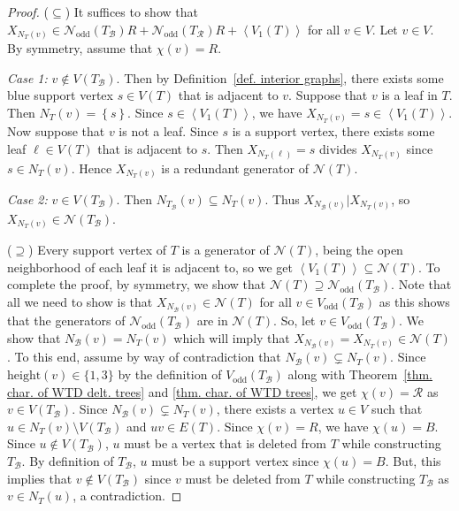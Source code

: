 \documentclass[12pt, reqno]{amsart}
\theoremstyle{definition}
\theoremstyle{plain}
\theoremstyle{definition}
\newcommand{\hh}{\mbox{height}}
\newcommand{\R}{\mathcal{R}}
\newcommand{\B}{\mathcal{B}}
\newcommand\gen[1]{\left\langle #1 \right\rangle}
\newcommand\set[1]{\left\lbrace #1 \right\rbrace}
\newcommand{\NN}{\mathcal{N}}
\begin{document}
\begin{proof}
($\subseteq$) It suffices to show that $X_{N_T(v)} \in \NN_{\text{odd}}(T_\B)R + \NN_{\text{odd}}(T_\R)R + \gen{V_1(T)}$ for all $v \in V$.
Let $v \in V$.
By symmetry, assume that $\chi(v) = R$.

\setlength{\leftskip}{5mm}

\noindent\emph{Case 1:} $v \not\in V(T_\B)$.  
Then by Definition~\ref{def. interior graphs}, there exists some blue support vertex $s \in V(T)$ that is adjacent to $v$.
Suppose that $v$ is a leaf in $T$. 
Then $N_T(v) = \set{s}$.
Since $s \in \gen{V_1(T)}$, we have $X_{N_T(v)} = s \in \gen{V_1(T)}$.
Now suppose that $v$ is not a leaf.
Since $s$ is a support vertex, there exists some leaf $\ell \in V(T)$ that is adjacent to $s$.
Then $X_{N_T(\ell)} = s$ divides $X_{N_T(v)}$ since $s \in N_T(v)$.
Hence $X_{N_T(v)}$ is a redundant generator of $\NN(T)$.

\vspace{2mm}

\noindent\emph{Case 2:} $v \in V(T_\B)$.
Then $N_{T_\B}(v) \subseteq N_T(v)$.
Thus $X_{N_\B(v)}|X_{N_T(v)}$, so $X_{N_T(v)} \in \NN(T_\B)$.

\setlength{\leftskip}{0mm}

\vspace{2mm}

\noindent($\supseteq$) Every support vertex of $T$ is a generator of $\NN(T)$, being the open neighborhood of each leaf it is adjacent to, so we get $\gen{V_1(T)} \subseteq \NN(T)$.
To complete the proof, by symmetry, we show that $\NN(T) \supseteq \NN_{\text{odd}}(T_\B)$.
Note that all we need to show is that $X_{N_\B(v)} \in \NN(T)$ for all $v \in V_{\text{odd}}(T_\B)$ as this shows that the generators of $\NN_{\text{odd}}(T_\B)$ are in $\NN(T)$.
So, let $v \in V_{\text{odd}}(T_\B)$.
We show that $N_\B(v) = N_T(v)$ which will imply that $X_{N_\B(v)} = X_{N_T(v)} \in \NN(T)$. 
To this end, assume by way of contradiction that $N_\B(v) \subsetneq N_T(v)$.
Since $\hh(v) \in \{1,3\}$ by the definition of $V_{\text{odd}}(T_\B)$ along with Theorem~\ref{thm. char. of WTD delt. trees} and \ref{thm. char. of WTD trees}, we get $\chi(v) = \R$ as $v \in V(T_\B)$.
Since $N_\B(v) \subsetneq N_T(v)$, there exists a vertex $u \in V$ such that $u \in N_T(v)\setminus V(T_\B)$ and $uv \in E(T)$.
Since $\chi(v) = R$, we have $\chi(u) = B$.
Since $u \not\in V(T_\B)$, $u$ must be a vertex that is deleted from $T$ while constructing $T_\B$.
By definition of $T_\B$, $u$ must be a support vertex since $\chi(u) = B$.
But, this implies that $v \not\in V(T_\B)$ since $v$ must be deleted from $T$ while constructing $T_\B$ as $v \in N_T(u)$, a contradiction.
\end{proof}
\end{document}
